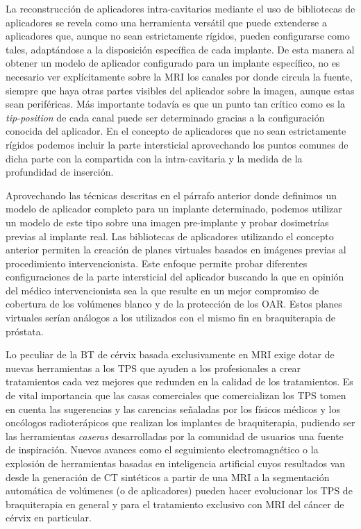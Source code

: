 \documentclass[
  a4paper,
]{scrreprt}
\begin{document}
La reconstrucción de aplicadores intra-cavitarios mediante el uso de
bibliotecas de aplicadores se revela como una herramienta versátil que
puede extenderse a aplicadores que, aunque no sean estrictamente
rígidos, pueden configurarse como tales, adaptándose a la disposición
específica de cada implante. De esta manera al obtener un modelo de
aplicador configurado para un implante específico, no es necesario ver
explícitamente sobre la MRI los canales por donde circula la fuente,
siempre que haya otras partes visibles del aplicador sobre la imagen,
aunque estas sean periféricas. Más importante todavía es que un punto
tan crítico como es la \emph{tip-position} de cada canal puede ser
determinado gracias a la configuración conocida del aplicador. En el
concepto de aplicadores que no sean estrictamente rígidos podemos
incluir la parte intersticial aprovechando los puntos comunes de dicha
parte con la compartida con la intra-cavitaria y la medida de la
profundidad de inserción.

Aprovechando las técnicas descritas en el párrafo anterior donde
definimos un modelo de aplicador completo para un implante determinado,
podemos utilizar un modelo de este tipo sobre una imagen pre-implante y
probar dosimetrías previas al implante real. Las bibliotecas de
aplicadores utilizando el concepto anterior permiten la creación de
planes virtuales basados en imágenes previas al procedimiento
intervencionista. Este enfoque permite probar diferentes configuraciones
de la parte intersticial del aplicador buscando la que en opinión del
médico intervencionista sea la que resulte en un mejor compromiso de
cobertura de los volúmenes blanco y de la protección de los OAR. Estos
planes virtuales serían análogos a los utilizados con el mismo fin en
braquiterapia de próstata.

Lo peculiar de la BT de cérvix basada exclusivamente en MRI exige dotar
de nuevas herramientas a los TPS que ayuden a los profesionales a crear
tratamientos cada vez mejores que redunden en la calidad de los
tratamientos. Es de vital importancia que las casas comerciales que
comercializan los TPS tomen en cuenta las sugerencias y las carencias
señaladas por los físicos médicos y los oncólogos radioterápicos que
realizan los implantes de braquiterapia, pudiendo ser las herramientas
\emph{caseras} desarrolladas por la comunidad de usuarios una fuente de
inspiración. Nuevos avances como el seguimiento electromagnético o la
explosión de herramientas basadas en inteligencia artificial cuyos
resultados van desde la generación de CT sintéticos a partir de una MRI
a la segmentación automática de volúmenes (o de aplicadores) pueden
hacer evolucionar los TPS de braquiterapia en general y para el
tratamiento exclusivo con MRI del cáncer de cérvix en particular.
\end{document}
